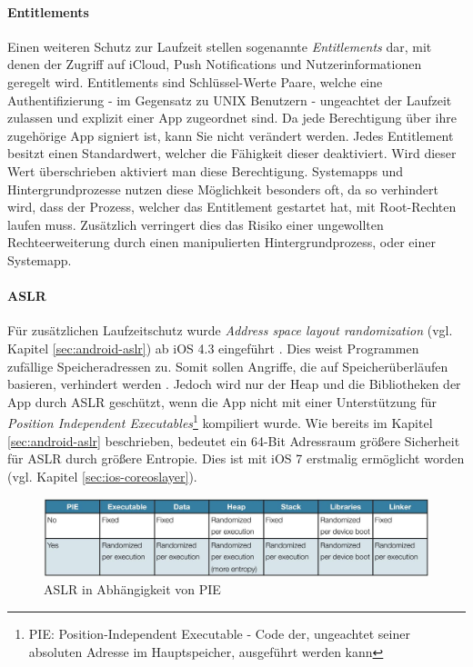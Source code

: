 		\paragraph{Entitlements}
			Einen weiteren Schutz zur Laufzeit stellen sogenannte \textsl{Entitlements}
			dar, mit denen der Zugriff auf iCloud, Push	Notifications und
			Nutzerinformationen geregelt wird. Entitlements sind Schlüssel-Werte Paare,
			welche eine	Authentifizierung - im Gegensatz zu UNIX Benutzern - ungeachtet
			der Laufzeit zulassen und explizit einer App zugeordnet sind. Da jede
			Berechtigung über ihre zugehörige App signiert ist, kann Sie nicht
			verändert werden. Jedes Entitlement besitzt einen Standardwert, welcher die
			Fähigkeit dieser deaktiviert. Wird dieser Wert überschrieben aktiviert man
			diese Berechtigung.	Systemapps und Hintergrundprozesse nutzen diese
			Möglichkeit besonders oft, da so verhindert wird, dass der Prozess, welcher
			das Entitlement gestartet hat, mit Root-Rechten laufen muss.
			Zusätzlich verringert dies das Risiko einer ungewollten Rechteerweiterung
			durch einen manipulierten Hintergrundprozess, oder einer Systemapp.
		
		\paragraph{ASLR}\label{sec:ios-aslr}
			Für zusätzlichen Laufzeitschutz wurde \textsl{Address space layout
			randomization} (vgl. Kapitel
			\ref{sec:android-aslr}) ab iOS 4.3 eingeführt \cite[S.
			1]{iOS4SecurityEvalutaion}.
			Dies weist Programmen zufällige Speicheradressen zu. Somit sollen Angriffe,
			die auf Speicherüberläufen basieren, verhindert werden \cite[S.
			131]{Levin2012}.
			Jedoch wird nur der Heap und die Bibliotheken der App durch
			ASLR geschützt, wenn die App nicht mit einer Unterstützung für
			\textsl{Position Independent Executables}\footnote{PIE: Position-Independent
			Executable - Code der, ungeachtet seiner absoluten Adresse im Hauptspeicher,
			ausgeführt werden kann} kompiliert wurde. Wie bereits im Kapitel
			\ref{sec:android-aslr} beschrieben, bedeutet ein 64-Bit Adressraum größere
			Sicherheit für ASLR durch größere Entropie. Dies ist mit iOS 7 erstmalig
			ermöglicht worden (vgl. Kapitel \ref{sec:ios-coreoslayer}).
			\begin{figure}[h]
				\centering
				\includegraphics[width=0.9\linewidth]{ios/media/aslr-pie.jpg}
				\caption{ASLR in Abhängigkeit von PIE
				\cite[S. 1]{iOS4SecurityEvalutaion}}
				\label{fig:aslr}
			\end{figure}
		

